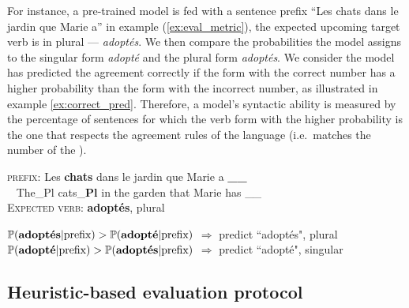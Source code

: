 \noindent For instance, a pre-trained model is fed with a sentence prefix ``Les chats dans le jardin que Marie a'' in example (\ref{ex:eval_metric}), the expected upcoming target verb is in plural --- \textit{adoptés}. We then compare the probabilities the model assigns to the singular form \textit{adopté} and the plural form \textit{adoptés}. We consider the model has predicted the
agreement correctly if the form with the correct number has a higher
probability than the form with the incorrect number, as illustrated in example \ref{ex:correct_pred}. Therefore, a model's syntactic ability is measured by the
percentage of sentences for which the verb form with the higher
probability is the one that respects the agreement rules of the
language (i.e.\ matches the number of the \cue).

\begin{exe}
   \ex\label{ex:eval_metric}
  \gll \textsc{prefix:} Les \textbf{chats} dans le jardin que Marie a \textbf{\_\_}  \\
  {\fontsize{9}{11}\selectfont \ } {\fontsize{9}{11}\selectfont The\_Pl} {\fontsize{9}{11}\selectfont cats\_\textbf{Pl}} {\fontsize{9}{11}\selectfont in} {\fontsize{9}{11}\selectfont the} {\fontsize{9}{11}\selectfont garden} {\fontsize{9}{11}\selectfont that} {\fontsize{9}{11}\selectfont Marie} {\fontsize{9}{11}\selectfont has} {\fontsize{9}{11}\selectfont \_\_}  \\
  \textsc{Expected verb}: \textbf{adoptés}, plural  \\
   \begin{xlist}
    \vspace{-2ex}
    \ex \label{ex:correct_pred} $\mathbb{P}(\textrm{\bf adoptés}|\textrm{prefix}) >
      \mathbb{P}(\textrm{\bf adopté}|\textrm{prefix})$ $\Rightarrow$ predict ``adoptés", plural \  \\
      \vspace{-2ex}
    \ex \label{ex:wrong_pred} $\mathbb{P}(\textrm{\bf adopté}|\textrm{prefix}) >
      \mathbb{P}(\textrm{\bf adoptés}|\textrm{prefix})$ $\Rightarrow$ predict ``adopté", singular \  
      \end{xlist}
\end{exe}



\subsection{Heuristic-based evaluation protocol}\label{sec:h_eval_protocol}

